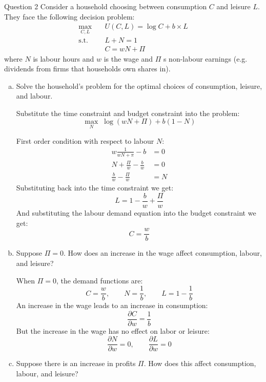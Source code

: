 \documentclass[a4paper]{article}
\begin{document}
	\begin{questionbox}{Question 2}
		Consider a household choosing between consumption \( C \) and leisure \( L \). They face the following decision problem:
		\begin{align*}
			\max_{C,L}\quad &U(C,L) = \log C + b \times L\\
			\text{s.t.}\quad &L + N = 1\\
			& C = wN + \Pi
		\end{align*}
		where \( N \) is labour hours and \( w \) is the wage and \( \Pi \) s non-labour earnings (e.g. dividends from firms that households own shares in).
		\begin{enumerate}[(a)]
			\item Solve the household's problem for the optimal choices of consumption, leisure, and labour.
			\begin{explanationbox}
				Substitute the time constraint and budget constraint into the problem:
				\[
					\max_N\; \log(wN+\Pi)+b(1-N)
				\]
			\end{explanationbox}
			\begin{explanationbox}
				First order condition with respect to labour \( N \):
				\begin{align*}
					w\frac{1}{wN+\pi}-b&=0\\
					N+\frac{\Pi}{w}-\frac{b}{w} &=0\\
					\frac{b}{w}-\frac{\Pi}{w} &= N
				\end{align*}
				Substituting back into the time constraint we get:
				\[
					L = 1 - \frac{b}{w}+\frac{\Pi}{w}
				\]
				And substituting the labour demand equation into the budget constraint we get:
				\[
					C = \frac{w}{b}
				\]
			\end{explanationbox}
			\item Suppose \( \Pi = 0 \). How does an increase in the wage affect consumption, labour, and leisure?
			\begin{explanationbox}
				When \( \Pi = 0 \), the demand functions are:
				\[
					C = \frac{w}{b}, \qquad N = \frac{1}{b}, \qquad L= 1-\frac{1}{b}
				\]
				An increase in the wage leads to an increase in consumption:
				\[
					\frac{\partial C}{\partial w} = \frac{1}{b}
				\]
				But the increase in the wage has no effect on labor or leisure:
				\[
					\frac{\partial N}{\partial w}=0, \qquad \frac{\partial L}{\partial w} = 0
				\]
			\end{explanationbox}
			\item Suppose there is an increase in profits \( \Pi \). How does this affect consumption, labour, and leisure?

\end{enumerate}
\end{questionbox}
\end{document}
